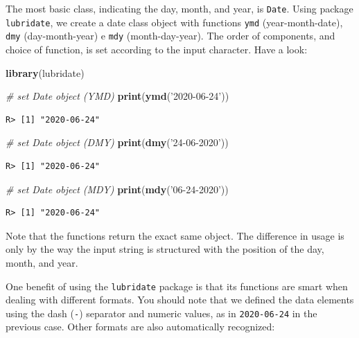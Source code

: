 \documentclass[
  12pt,
]{book}
\newenvironment{Shaded}{\begin{snugshade}}{\end{snugshade}}
\newcommand{\CommentTok}[1]{\textcolor[rgb]{0.37,0.37,0.37}{\textit{#1}}}
\newcommand{\KeywordTok}[1]{\textcolor[rgb]{0.27,0.27,0.27}{\textbf{#1}}}
\newcommand{\NormalTok}[1]{#1}
\newcommand{\StringTok}[1]{\textcolor[rgb]{0.5,0.5,0.5}{#1}}
\begin{document}
The most basic class, indicating the day, month, and year, is \texttt{Date}. Using package \texttt{lubridate}, we create a date class object with functions \texttt{ymd} (year-month-date), \texttt{dmy} (day-month-year) e \texttt{mdy} (month-day-year). The order of components, and choice of function, is set according to the input character. Have a look:   

\begin{Shaded}
\begin{Highlighting}[]
\KeywordTok{library}\NormalTok{(lubridate)}

\CommentTok{# set Date object (YMD)}
\KeywordTok{print}\NormalTok{(}\KeywordTok{ymd}\NormalTok{(}\StringTok{'2020-06-24'}\NormalTok{))}
\end{Highlighting}
\end{Shaded}

\begin{verbatim}
R> [1] "2020-06-24"
\end{verbatim}

\begin{Shaded}
\begin{Highlighting}[]
\CommentTok{# set Date object (DMY)}
\KeywordTok{print}\NormalTok{(}\KeywordTok{dmy}\NormalTok{(}\StringTok{'24-06-2020'}\NormalTok{))}
\end{Highlighting}
\end{Shaded}

\begin{verbatim}
R> [1] "2020-06-24"
\end{verbatim}

\begin{Shaded}
\begin{Highlighting}[]
\CommentTok{# set Date object (MDY)}
\KeywordTok{print}\NormalTok{(}\KeywordTok{mdy}\NormalTok{(}\StringTok{'06-24-2020'}\NormalTok{))}
\end{Highlighting}
\end{Shaded}

\begin{verbatim}
R> [1] "2020-06-24"
\end{verbatim}

Note that the functions return the exact same object. The difference in usage is only by the way the input string is structured with the position of the day, month, and year.

One benefit of using the \texttt{lubridate} package is that its functions are smart when dealing with different formats. You should note that we defined the data elements using the dash (\texttt{-}) separator and numeric values, as in \texttt{\textquotesingle{}2020-06-24\textquotesingle{}} in the previous case. Other formats are also automatically recognized:
\end{document}
